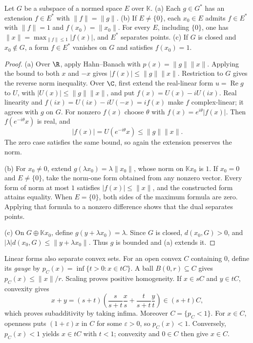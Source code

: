 \begin{corollary}\label{cor:hbnorm}
Let $G$ be a subspace of a normed space $E$ over $\mathbb K$. (a) Each $g\in G^*$ has an extension $f\in E^*$ with $\|f\|=\|g\|$. (b) If $E\ne\{0\}$, each $x_0\in E$ admits $f\in E^*$ with $\|f\|=1$ and $f(x_0)=\|x_0\|$. For every $E$, including $\{0\}$, one has $\|x\|=\max_{\|f\|\le1}|f(x)|$, and $E^*$ separates points. (c) If $G$ is closed and $x_0\notin G$, a form $f\in E^*$ vanishes on $G$ and satisfies $f(x_0)=1$.
\end{corollary}
\begin{proof}
(a) Over $\R$, apply Hahn--Banach with $p(x)=\|g\|\|x\|$. Applying the bound to both $x$ and $-x$ gives $|f(x)|\le\|g\|\|x\|$. Restriction to $G$ gives the reverse norm inequality. Over $\C$, first extend the real-linear form $u=\operatorname{Re}g$ to $U$, with $|U(x)|\le\|g\|\|x\|$, and put $f(x)=U(x)-iU(ix)$. Real linearity and $f(ix)=U(ix)-iU(-x)=if(x)$ make $f$ complex-linear; it agrees with $g$ on $G$. For nonzero $f(x)$ choose $\theta$ with $f(x)=e^{i\theta}|f(x)|$. Then $f(e^{-i\theta}x)$ is real, and
\[|f(x)|=U(e^{-i\theta}x)\le\|g\|\|x\|.\]
The zero case satisfies the same bound, so again the extension preserves the norm.

(b) For $x_0\ne0$, extend $g(\lambda x_0)=\lambda\|x_0\|$, whose norm on $\mathbb Kx_0$ is $1$. If $x_0=0$ and $E\ne\{0\}$, take the norm-one form obtained from any nonzero vector. Every form of norm at most $1$ satisfies $|f(x)|\le\|x\|$, and the constructed form attains equality. When $E=\{0\}$, both sides of the maximum formula are zero. Applying that formula to a nonzero difference shows that the dual separates points.

(c) On $G\oplus\mathbb Kx_0$, define $g(y+\lambda x_0)=\lambda$. Since $G$ is closed, $d(x_0,G)>0$, and $|\lambda|d(x_0,G)\le\|y+\lambda x_0\|$. Thus $g$ is bounded and (a) extends it.
\end{proof}

Linear forms also separate convex sets. For an open convex $C$ containing $0$, define its \emph{gauge} by $p_C(x)=\inf\{t>0:x\in tC\}$. A ball $B(0,r)\subseteq C$ gives $p_C(x)\le\|x\|/r$. Scaling proves positive homogeneity. If $x\in sC$ and $y\in tC$, convexity gives
\[x+y=(s+t)\left(\frac{s}{s+t}\frac xs+\frac{t}{s+t}\frac yt\right)\in(s+t)C,\]
which proves subadditivity by taking infima. Moreover $C=\{p_C<1\}$. For $x\in C$, openness puts $(1+\varepsilon)x$ in $C$ for some $\varepsilon>0$, so $p_C(x)<1$. Conversely, $p_C(x)<1$ yields $x\in tC$ with $t<1$; convexity and $0\in C$ then give $x\in C$.

